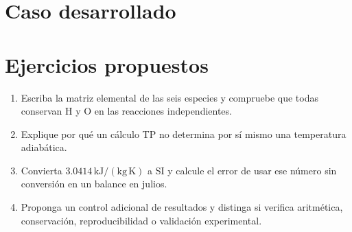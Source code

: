 \section{Caso desarrollado}

\section{Ejercicios propuestos}
\begin{enumerate}
\item Escriba la matriz elemental de las seis especies y compruebe que todas conservan H y O en las reacciones independientes.
\item Explique por qué un cálculo TP no determina por sí mismo una temperatura adiabática.
\item Convierta $3.0414\,\mathrm{kJ/(kg\,K)}$ a SI y calcule el error de usar ese número sin conversión en un balance en julios.
\item Proponga un control adicional de resultados y distinga si verifica aritmética, conservación, reproducibilidad o validación experimental.
\end{enumerate}


\studiumchaptercheck
